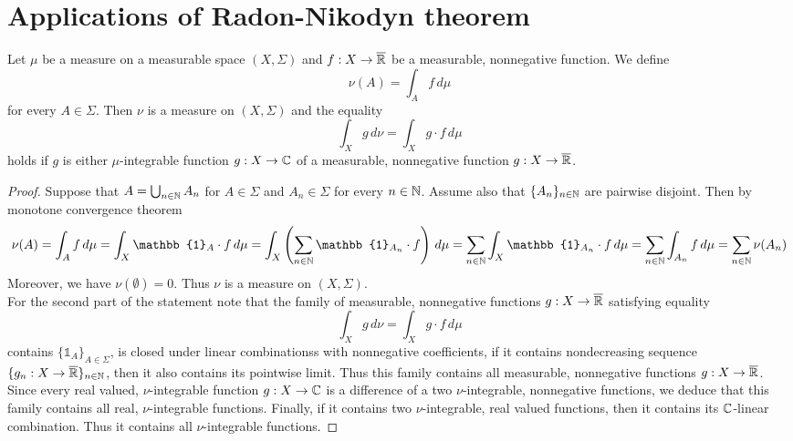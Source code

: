 \section{Applications of Radon-Nikodyn theorem}

\begin{proposition}\label{proposition:derivativeandintegration}
Let $\mu$ be a measure on a measurable space $(X,\Sigma)$ and $f:X\rightarrow \overline{{\mathbb R}}$ be a measurable, nonnegative function. We define
$$\nu(A) = \int_Af\,d\mu$$
for every $A\in \Sigma$. Then $\nu$ is a measure on $(X,\Sigma)$ and the equality
$$\int_X g\,d\nu =\int_Xg\cdot f\,d\mu$$
holds if $g$ is either $\mu$-integrable function $g:X\rightarrow {\mathbb C}$ of a measurable, nonnegative function $g:X\rightarrow \overline{{\mathbb R}}$.
\end{proposition}
\begin{proof}
Suppose that $A = \bigcup_{n\in {\mathbb N}}A_n$ for $A\in \Sigma$ and $A_n\in \Sigma$ for every $n\in {\mathbb N}$. Assume also that $\{A_n\}_{n\in {\mathbb N}}$ are pairwise disjoint. Then by monotone convergence theorem
$$\nu(A) = \int_A f\,d\mu = \int_X\mathbb{1}_A\cdot f\,d\mu = \int_X\left(\sum_{n\in \NN}\mathbb{1}_{A_n}\cdot f\right)\,d\mu = \sum_{n\in \NN}\int_X\mathbb{1}_{A_n}\cdot f\,d\mu = \sum_{n\in \NN}\int_{A_n}f\,d\mu = \sum_{n\in \NN}\nu(A_n)$$
Moreover, we have $\nu(\emptyset) = 0$. Thus $\nu$ is a measure on $(X,\Sigma)$.\\
For the second part of the statement note that the family of measurable, nonnegative functions $g:X\rightarrow \overline{{\mathbb R}}$ satisfying equality
$$\int_Xg\,d\nu = \int_Xg\cdot f\,d\mu$$
contains $\{\mathbb{1}_A\}_{A\in \Sigma}$, is closed under linear combinationss with nonnegative coefficients, if it contains nondecreasing sequence $\{g_n:X\rightarrow \overline{{\mathbb R}}\}_{n\in {\mathbb N}}$, then it also contains its pointwise limit. Thus this family contains all measurable, nonnegative functions $g:X\rightarrow \overline{{\mathbb R}}$. Since every real valued, $\nu$-integrable function $g:X\rightarrow {\mathbb C}$ is a difference of a two $\nu$-integrable, nonnegative functions, we deduce that this family contains all real, $\nu$-integrable functions. Finally, if it contains two $\nu$-integrable, real valued functions, then it contains its ${\mathbb C}$-linear combination. Thus it contains all $\nu$-integrable functions.
\end{proof}

